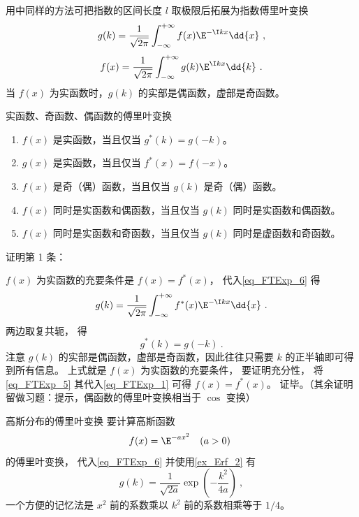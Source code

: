 

用中同样的方法可把指数的区间长度 $l$ 取极限后拓展为指数傅里叶变换
\begin{equation}\label{eq_FTExp_6}
g(k) = \frac{1}{\sqrt{2\pi }} \int_{-\infty }^{+\infty } f(x)\E^{-\I kx} \dd{x}~,
\end{equation}
\begin{equation}\label{eq_FTExp_1}
f(x) = \frac{1}{\sqrt{2\pi }} \int_{-\infty }^{+\infty } g(k)\E^{\I kx} \dd{k}~.
\end{equation}
当 $f(x)$ 为实函数时，$g(k)$ 的实部是偶函数，虚部是奇函数。

\begin{theorem}{实函数、奇函数、偶函数的傅里叶变换}\label{the_FTExp_1}
\begin{enumerate}
\item $f(x)$ 是实函数，当且仅当 $g^*(k) = g(-k)$。
\item $g(x)$ 是实函数，当且仅当 $f^*(x) = f(-x)$。
\item $f(x)$ 是奇（偶）函数，当且仅当 $g(k)$ 是奇（偶）函数。
\item $f(x)$ 同时是实函数和偶函数，当且仅当 $g(k)$ 同时是实函数和偶函数。
\item $f(x)$ 同时是实函数和奇函数，当且仅当 $g(k)$ 同时是虚函数和奇函数。
\end{enumerate}
\end{theorem}
证明第 1 条：

$f(x)$ 为实函数的充要条件是 $f(x) = f^*(x)$， 代入\autoref{eq_FTExp_6} 得
\begin{equation}
g(k) = \frac{1}{\sqrt{2\pi }} \int_{-\infty }^{+\infty } f^*(x)\E^{-\I kx} \dd{x}~.
\end{equation}
两边取复共轭， 得
\begin{equation}\label{eq_FTExp_5}
g^*(k) = g(-k)~.
\end{equation}
注意 $g(k)$ 的实部是偶函数，虚部是奇函数，因此往往只需要 $k$ 的正半轴即可得到所有信息。 上式就是 $f(x)$ 为实函数的充要条件， 要证明充分性， 将\autoref{eq_FTExp_5} 其代入\autoref{eq_FTExp_1} 可得 $f(x) = f^*(x)$。 证毕。（其余证明留做习题：提示，偶函数的傅里叶变换相当于 $\cos$ 变换）

\begin{example}{高斯分布的傅里叶变换}\label{ex_FTExp_1}
要计算高斯函数
\begin{equation}\label{eq_FTExp_12}
f(x) = \E^{-ax^2} \quad (a > 0)~
\end{equation}
的傅里叶变换， 代入\autoref{eq_FTExp_6} 并使用\autoref{ex_Erf_2} 有
\begin{equation}
g(k) = \frac{1}{\sqrt{2a}} \exp(-\frac{k^2}{4a})~,
\end{equation}
一个方便的记忆法是 $x^2$ 前的系数乘以 $k^2$ 前的系数相乘等于 $1/4$。
\end{example}


